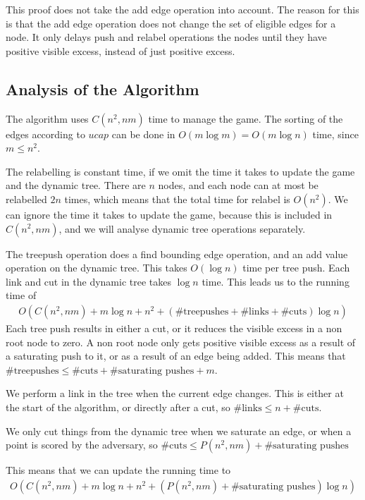 This proof does not take the add edge operation into account. The reason for this is that the add edge operation does not change the set of eligible edges for a node. 
It only delays push and relabel operations the nodes until they have positive visible excess, instead of just positive excess.

\subsection{Analysis of the Algorithm}
\label{KRAlgorithmAnalysisSection}

The algorithm uses $C(n^2, nm)$ time to manage the game.
The sorting of the edges according to $ucap$ can be done in $O(m\log m)=O(m\log n)$ time, since $m \leq n^2$.

The relabelling is constant time, if we omit the time it takes to update the game and the dynamic tree. 
There are $n$ nodes, and each node can at most be relabelled $2n$ times, which means that the total time for relabel is $O(n^2)$.
We can ignore the time it takes to update the game, because this is included in $C(n^2, nm)$, and we will analyse dynamic tree operations separately.

The treepush operation does a find bounding edge operation, and an add value operation on the dynamic tree. This takes $O(\log n)$ time per tree push.
Each link and cut in the dynamic tree takes $\log n$ time.
This leads us to the running time of
\begin{align*}
O\left(C\left(n^2, nm\right) + m\log n + n^2 + \left(\text{\#treepushes} + \text{\#links} + \text{\#cuts}\right)\log n\right)
\end{align*}
Each tree push results in either a cut, or it reduces the visible excess in a non root node to zero.
A non root node only gets positive visible excess as a result of a saturating push to it, or as a result of an edge being added. 
This means that $\text{\#treepushes} \leq \text{\#cuts} + \text{\#saturating pushes} + m$.

We perform a link in the tree when the current edge changes. This is either at the start of the algorithm, or directly after a cut, so $\text{\#links} \leq n + \text{\#cuts}$.

We only cut things from the dynamic tree when we saturate an edge, or when a point is scored by the adversary, so $\text{\#cuts} \leq P(n^2, nm) + \text{\#saturating pushes}$

This means that we can update the running time to
\begin{align*}
O\left(C\left(n^2, nm\right) + m\log n + n^2 + \left(P\left(n^2, nm\right) + \text{\#saturating pushes}\right)\log n\right)
\end{align*}

